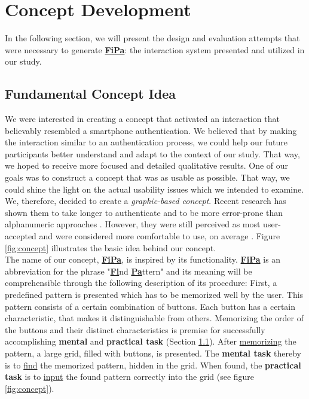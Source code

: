 \section{Concept Development} \label{4.2}

In the following section, we will present the design and evaluation attempts that were necessary to generate \underline{\textbf{FiPa}}: the interaction system presented and utilized in our study. 

\subsection{Fundamental Concept Idea} \label{4.2.1}
We were interested in creating a concept that activated an interaction that believably resembled a smartphone authentication. We believed that by making the interaction similar to an authentication process, we could help our future participants better understand and adapt to the context of our study. That way, we hoped to receive more focused and detailed qualitative results. One of our goals was to construct a concept that was as usable as possible.  That way, we could shine the light on the actual usability issues which we intended to examine. We, therefore, decided to create a \textit{graphic-based concept}. Recent research has shown them to take longer to authenticate and to be more error-prone than alphanumeric approaches \cite{AnatomySmartphone}. However, they were still perceived as most user-accepted and were considered more comfortable to use, on average \cite{PatternWild}. Figure \ref{fig:concept} illustrates the basic idea behind our concept. \\ 

The name of our concept, \underline{\textbf{FiPa}}, is inspired by its functionality. \underline{\textbf{FiPa}} is an abbreviation for the phrase "\underline{\textbf{Fi}}nd \underline{\textbf{Pa}}ttern" and its meaning will be comprehensible through the following description of its procedure: First, a predefined pattern is presented which has to be memorized well by the user. This pattern consists of a certain combination of buttons. Each button has a certain characteristic, that makes it distinguishable from others. Memorizing the order of the buttons and their distinct characteristics is premise for successfully accomplishing \textbf{mental} and \textbf{practical task} (Section \ref{4.2.1}). After \underline{memorizing} the pattern, a large grid, filled with buttons, is presented. The \textbf{mental task} thereby is to \underline{find} the memorized pattern, hidden in the grid. When found, the \textbf{practical task} is to \underline{input} the found pattern correctly into the grid (see figure \ref{fig:concept}).\\


